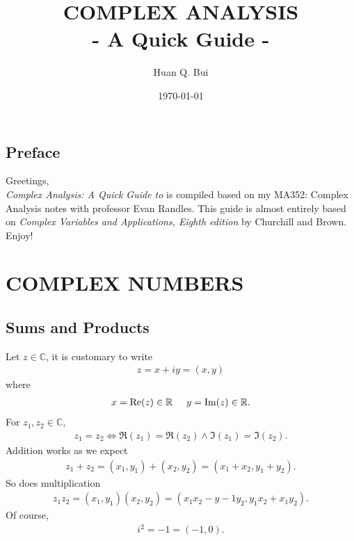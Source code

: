 \documentclass{book}
\theoremstyle{definition}
\newcommand{\R}{\mathbb{R}}
\newcommand{\C}{\mathbb{C}}
\begin{document}
	\begin{titlepage}\centering
		\clearpage
		\title{\textsc{\bf{COMPLEX ANALYSIS}}\\\smallskip - A Quick Guide -\\}
		\author{\bigskip Huan Q. Bui}
		\date{\today}
		\maketitle
		\thispagestyle{empty}
	\end{titlepage}

\newpage

\section*{Preface}

Greetings,\\

\textit{Complex Analysis: A Quick Guide to} is compiled based on my MA352: Complex Analysis notes with professor Evan Randles. This guide is almost entirely based on \textit{Complex Variables and Applications, Eighth edition} by Churchill and Brown. \\

Enjoy!


\newpage
\tableofcontents
\newpage

\chapter{COMPLEX NUMBERS}

\section{Sums and Products}

Let $z \in \C$, it is customary to write
\begin{align}
z = x + iy = (x,y)
\end{align}
where
\begin{align}
x = \Re(z) \in \R \hspace{0.5cm} y = \Im(z) \in \R.
\end{align}
For $z_1, z_2 \in \C$, 
\begin{align}
z_1 = z_2 \iff \Re(z_1) = \Re(z_2) \wedge \Im(z_1) = \Im(z_2).
\end{align}
Addition works as we expect
\begin{align}
z_1 + z_2 = (x_1, y_1) + (x_2, y_2) = (x_1 + x_2 , y_1 + y_2).
\end{align}
So does multiplication
\begin{align}
z_1z_2 = (x_1,y_1)(x_2,y_2) = (x_1x_2 - y-1y_2, y_1x_2 + x_1y_2).
\end{align}
Of course,
\begin{align}
i^2 = -1 = (-1,0).
\end{align}
\end{document}
